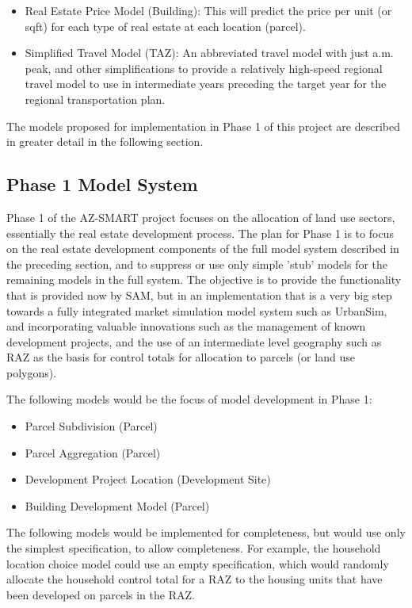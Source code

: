 \begin{itemize}
\begin{itemize}
\item Real Estate Price Model (Building): This will predict the price per unit (or sqft) for each type of real estate at each location (parcel).
\item Simplified Travel Model (TAZ): An abbreviated travel model with just a.m. peak, and other simplifications to provide a relatively high-speed regional travel model to use in intermediate years preceding the target year for the regional transportation plan.
\end{itemize}
\end{itemize}

The models proposed for implementation in Phase 1 of this project are described in greater detail in the following section.

\subsection{Phase 1 Model System}
Phase 1 of the AZ-SMART project focuses on the allocation of land use sectors, essentially the real estate development process.  The plan for Phase 1 is to focus on the real estate development components of the full model system described in the preceding section, and to suppress or use only simple 'stub' models for the remaining models in the full system.  The objective is to provide the functionality that is provided now by SAM, but in an implementation that is a very big step towards a fully integrated market simulation model system such as UrbanSim, and incorporating valuable innovations such as the management of known development projects, and the use of an intermediate level geography such as RAZ as the basis for control totals for allocation to parcels (or land use polygons).

The following models would be the focus of model development in Phase 1:

\begin{itemize}
\item Parcel Subdivision (Parcel)
\item Parcel Aggregation (Parcel)
\item Development Project Location (Development Site)
\item Building Development Model (Parcel)
\end{itemize}

The following models would be implemented for completeness, but would use only the simplest specification, to allow completeness.  For example, the household location choice model could use an empty specification, which would randomly allocate the household control total for a RAZ to the housing units that have been developed on parcels in the RAZ.

